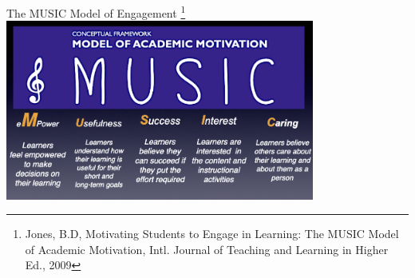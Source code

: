 \documentclass[aspectratio=169]{beamer}
\begin{document}
\begin{frame}{The MUSIC Model of Engagement}
\footnote{ Jones, B.D, Motivating Students to Engage in Learning: The MUSIC Model of Academic Motivation, Intl. Journal of Teaching and Learning in Higher Ed., 2009}
\centering\includegraphics[width=4in]{figs/music_model.png}
\end{frame}
\end{document}
